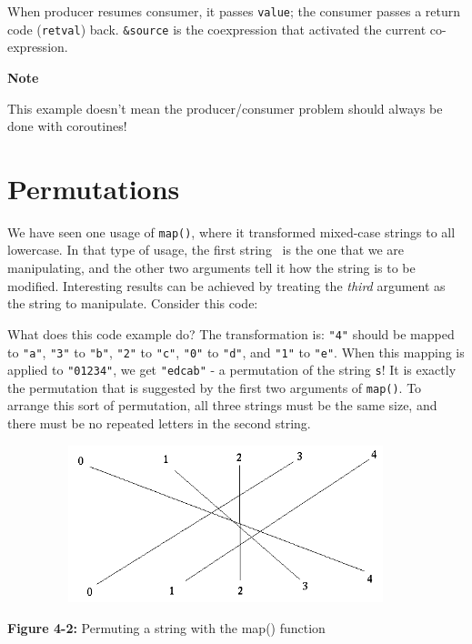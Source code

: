 When producer resumes consumer, it passes \texttt{value}; the consumer
passes a return code (\texttt{retval}) back. \texttt{\&source} is the
coexpression that activated the current co-expression.

{\sffamily\bfseries
Note}

{\sffamily
This example doesn't mean the producer/consumer problem
should always be done with coroutines!}

\section{Permutations}

We have seen one usage of
\texttt{map()}, where it transformed mixed-case strings to
all lowercase. In that type of usage, the first string \ is the one
that we are manipulating, and the other two arguments tell it how the
string is to be modified. Interesting results can be achieved by
treating the \textit{third} argument as the string to manipulate.
Consider this code:


What does this code example do? The transformation is:
\texttt{"4"} should be mapped to
\texttt{"a"},
\texttt{"3"} to
\texttt{"b"},
\texttt{"2"} to
\texttt{"c"},
\texttt{"0"} to
\texttt{"d"}, and
\texttt{"1"} to
\texttt{"e"}. When this mapping is applied
to \texttt{"01234"}, we get
\texttt{"edcab"} - a permutation of the
string \texttt{s}! It is exactly the permutation that is suggested by
the first two arguments of \texttt{map()}. To arrange this sort of
permutation, all three strings must be the same size, and there must be
no repeated letters in the second string.


\begin{center}
\includegraphics[width=5.0in,height=1.8in]{ub-img/ub-img9.png}
\end{center}
{\sffamily\bfseries Figure 4-2:}
{\sffamily Permuting a string with the map() function}

